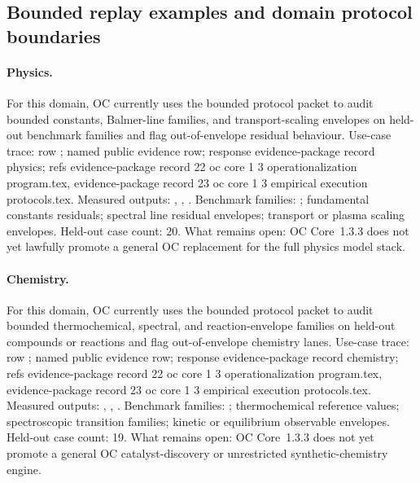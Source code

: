 \subsection{Bounded replay examples and domain protocol boundaries}

\paragraph{Physics.}
For this domain, OC currently uses the bounded protocol packet to audit bounded constants, Balmer-line families, and transport-scaling envelopes on held-out benchmark families and flag out-of-envelope residual behaviour.
Use-case trace: row ; named public evidence row; \allowbreak response evidence-package record physics; \allowbreak refs evidence-package record 22 oc core 1 3 operationalization program.tex, \allowbreak evidence-package record 23 oc core 1 3 empirical execution protocols.tex.
Measured outputs: , , .
Benchmark families: ; fundamental constants residuals; spectral line residual envelopes; transport or plasma scaling envelopes.
Held-out case count: 20.
What remains open: OC Core~1.3.3 does not yet lawfully promote a general OC replacement for the full physics model stack.

\paragraph{Chemistry.}
For this domain, OC currently uses the bounded protocol packet to audit bounded thermochemical, spectral, and reaction-envelope families on held-out compounds or reactions and flag out-of-envelope chemistry lanes.
Use-case trace: row ; named public evidence row; \allowbreak response evidence-package record chemistry; \allowbreak refs evidence-package record 22 oc core 1 3 operationalization program.tex, \allowbreak evidence-package record 23 oc core 1 3 empirical execution protocols.tex.
Measured outputs: , , .
Benchmark families: ; thermochemical reference values; spectroscopic transition families; kinetic or equilibrium observable envelopes.
Held-out case count: 19.
What remains open: OC Core~1.3.3 does not yet promote a general OC catalyst-discovery or unrestricted synthetic-chemistry engine.

